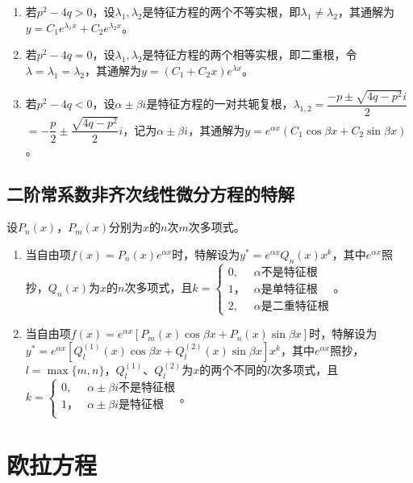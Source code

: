 \documentclass[UTF8, 12pt]{ctexart}
\begin{document}
\begin{enumerate}
    \item 若$p^2-4q>0$，设$\lambda_1,\lambda_2$是特征方程的两个不等实根，即$\lambda_1\neq\lambda_2$，其通解为$y=C_1e^{\lambda_1x}+C_2e^{\lambda_2x}$。
    \item 若$p^2-4q=0$，设$\lambda_1,\lambda_2$是特征方程的两个相等实根，即二重根，令$\lambda=\lambda_1=\lambda_2$，其通解为$y=(C_1+C_2x)e^{\lambda x}$。
    \item 若$p^2-4q<0$，设$\alpha\pm\beta i$是特征方程的一对共轭复根，$\lambda_{1,2}=\dfrac{-p\pm\sqrt{4q-p^2}i}{2}$\\$=-\dfrac{p}{2}\pm\dfrac{\sqrt{4q-p^2}}{2}i$，记为$\alpha\pm\beta i$，其通解为$y=e^{\alpha x}(C_1\cos\beta x+C_2\sin\beta x)$。
\end{enumerate}

\subsection{二阶常系数非齐次线性微分方程的特解}

设$P_n(x)$，$P_m(x)$分别为$x$的$n$次$m$次多项式。

\begin{enumerate}
    \item 当自由项$f(x)=P_n(x)e^{\alpha x}$时，特解设为$y^*=e^{\alpha x}Q_n(x)x^k$，其中$e^{\alpha x}$照抄，$Q_n(x)$为$x$的$n$次多项式，且$k=\left\{\begin{array}{ll}
        0, & \alpha\text{不是特征根} \\
        1， & \alpha\text{是单特征根} \\
        2, & \alpha\text{是二重特征根}
    \end{array}\right.$。
    \item 当自由项$f(x)=e^{\alpha x}[P_m(x)\cos\beta x+P_n(x)\sin\beta x]$时，特解设为$y^*=e^{\alpha x}[Q_l^{(1)}(x)\cos\beta x+Q_l^{(2)}(x)\sin\beta x]x^k$，其中$e^{\alpha x}$照抄，$l=\max\{m,n\}$，$Q_l^{(1)}$、$Q_l^{(2)}$为$x$的两个不同的$l$次多项式，且$k=\left\{\begin{array}{ll}
        0, & \alpha\pm\beta i\text{不是特征根} \\
        1， & \alpha\pm\beta i\text{是特征根} \\
    \end{array}\right.$。
\end{enumerate}

\section{欧拉方程}
\end{document}
